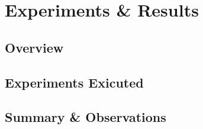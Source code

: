\chapter{Experiments \& Results}\label{ch:results}

\section{Overview}

\section{Experiments Exicuted}

\section{Summary \& Observations}
